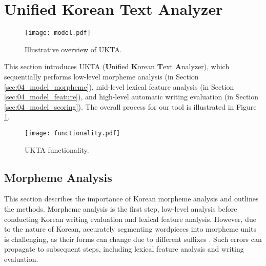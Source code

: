 \section{Unified Korean Text Analyzer}
\label{sec:04_model}
\begin{figure}[t]
\texttt{[image: model.pdf]}
\centering

\caption{Illustrative overview of \textsf{UKTA}.} 
\label{fig:approach}
\end{figure}


This section introduces \textsf{UKTA} (\textbf{U}nified \textbf{K}orean \textbf{T}ext \textbf{A}nalyzer), which sequentially performs low-level morpheme analysis (in Section \ref{sec:04_model_morpheme}), mid-level lexical feature analysis (in Section \ref{sec:04_model_feature}), and high-level automatic writing evaluation (in Section \ref{sec:04_model_scoring}).
The overall process for our tool is illustrated in Figure \ref{fig:approach}.



\begin{figure*}[t]
  \texttt{[image: functionality.pdf]}
  \centering
  \caption{\textsf{UKTA} functionality. }
  \label{fig:functions}
  \vspace{\baselineskip}
\end{figure*}


\subsection{Morpheme Analysis\label{sec:04_model_morpheme}}

This section describes the importance of Korean morpheme analysis and outlines the methods.
Morpheme analysis is the first step, low-level analysis before conducting Korean writing evaluation and lexical feature analysis. 
However, due to the nature of Korean, accurately segmenting wordpieces into morpheme units is challenging, as their forms can change due to different suffixes \cite{matteson2018rich}. 
Such errors can propagate to subsequent steps, including lexical feature analysis and writing evaluation. 

